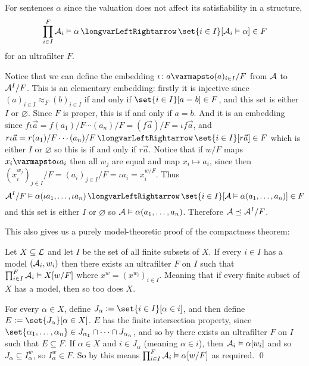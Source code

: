 For sentences $\alpha$ since the valuation does not affect its satisfiability in a structure,
$$ \prod_{i\in I}^F{\cal A}_i\vDash\alpha \iff \set{i\in I}[{\cal A}_i\vDash\alpha]\in F $$
for an ultrafilter $F$.

Notice that we can define the embedding $\iota\colon a\varmapsto(a)_{i\in I}/F$ from ${\cal A}$ to ${\cal A}^I/F$.
This is an elementary embedding: firstly it is injective since $(a)_{i\in I}\approx_F(b)_{i\in I}$ if and only if $\set{i\in I}[a=b]\in F$, and this set is either $I$ or $\varnothing$.
Since $F$ is proper, this is if and only if $a=b$.
And it is an embedding since $f\iota\vec a=f(a_1)/F\cdots(a_n)/F=(f\vec a)/F=\iota f\vec a$, and $r\iota\vec a=r(a_1)/F\cdots(a_n)/F\iff\set{i\in I}[r\vec a]\in F$ which is either $I$ or $\varnothing$
so this is if and only if $r\vec a$.
Notice that if $w/F$ maps $x_i\varmapsto\iota a_i$ then all $w_j$ are equal and map $x_i\mapsto a_i$, since then $(x_i^{w_j})_{j\in I}/F=(a_i)_{j\in I}/F=\iota a_i=x_i^{w/F}$.
Thus
$$ {\cal A}^I/F\vDash\alpha(\iota a_1,\dots,\iota a_n) \iff \set{i\in I}[{\cal A}\vDash\alpha(a_1,\dots,a_n)] \in F $$
and this set is either $I$ or $\varnothing$ so ${\cal A}\vDash\alpha(a_1,\dots,a_n)$.
Therefore ${\cal A}\preceq{\cal A}^I/F$.

This also gives us a purely model-theoretic proof of the compactness theorem:

\bthrm[title=The Compactness Theorem, name=mtcompact]

    Let $X\subseteq{\cal L}$ and let $I$ be the set of all finite subsets of $X$.
    If every $i\in I$ has a model $({\cal A}_i,w_i)$ then there exists an ultrafilter $F$ on $I$ such that $\prod_{i\in I}^F{\cal A}_i\vDash X[w/F]$ where $x^w=(x^{w_i})_{i\in I}$.
    Meaning that if every finite subset of $X$ has a model, then so too does $X$.

\ethrm

For every $\alpha\in X$, define $J_\alpha\coloneqq\set{i\in I}[\alpha\in i]$, and then define $E\coloneqq\set{J_\alpha}[\alpha\in X]$.
$E$ has the finite intersection property, since $\set{\alpha_1,\dots,\alpha_n}\in J_{\alpha_1}\cap\cdots\cap J_{\alpha_n}$, and so by  there exists an ultrafilter $F$ on $I$ such
that $E\subseteq F$.
If $\alpha\in X$ and $i\in J_\alpha$ (meaning $\alpha\in i$), then ${\cal A}_i\vDash\alpha[w_i]$ and so $J_\alpha\subseteq I^w_\alpha$, so $I^w_\alpha\in F$.
So by  this means $\prod_{i\in I}^F{\cal A}_i\vDash\alpha[w/F]$ as required.
\qed

